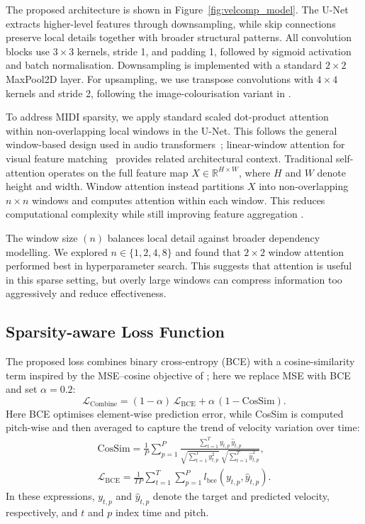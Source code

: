 The proposed architecture is shown in Figure~\ref{fig:velcomp_model}.
The U-Net extracts higher-level features through downsampling, while skip connections preserve local details together with broader structural patterns.
All convolution blocks use \(3 \times 3\) kernels, stride 1, and padding 1, followed by sigmoid activation and batch normalisation.
Downsampling is implemented with a standard \(2 \times 2\) MaxPool2D layer.
For upsampling, we use transpose convolutions with \(4 \times 4\) kernels and stride 2, following the image-colourisation variant in \cite{wang2022cunet}.

To address MIDI sparsity, we apply standard scaled dot-product attention~\cite{vas2017attn} within non-overlapping local windows in the U-Net. This follows the general window-based design used in audio transformers~\cite{chen2022hts}; linear-window attention for visual feature matching~\cite{shen2023linear} provides related architectural context.
Traditional self-attention \cite{vas2017attn} operates on the full feature map \(X \in \mathbb{R}^{H \times W}\), where \(H\) and \(W\) denote height and width.
Window attention instead partitions \(X\) into non-overlapping \(n \times n\) windows and computes attention within each window.
This reduces computational complexity while still improving feature aggregation \cite{chen2022hts}.

The window size \((n)\) balances local detail against broader dependency modelling.
We explored \(n \in \{1, 2, 4, 8\}\) and found that \(2 \times 2\) window attention performed best in hyperparameter search.
This suggests that attention is useful in this sparse setting, but overly large windows can compress information too aggressively and reduce effectiveness.

\subsection{Sparsity-aware Loss Function}
\label{sec:velcomp:loss}

The proposed loss combines binary cross-entropy (BCE) with a cosine-similarity term inspired by the MSE--cosine objective of \cite{kim2023piano}; here we replace MSE with BCE and set \(\alpha=0.2\):
\begin{equation}
\mathcal{L}_{\mathrm{Combine}} = (1-\alpha)\,\mathcal{L}_{\mathrm{BCE}} + \alpha\,\left(1-\mathrm{CosSim}\right).
\label{eq:velcomp_loss_combine}
\end{equation}
Here BCE optimises element-wise prediction error, while CosSim is computed pitch-wise and then averaged to capture the trend of velocity variation over time:
\begin{gather}
\mathrm{CosSim} = \frac{1}{P}\sum_{p=1}^{P}
\frac{\sum_{t=1}^{T} y_{t,p}\,\hat{y}_{t,p}}
{\sqrt{\sum_{t=1}^{T} y_{t,p}^{2}}\;\sqrt{\sum_{t=1}^{T} \hat{y}_{t,p}^{2}}},
\label{eq:velcomp_cossim}\\
\mathcal{L}_{\mathrm{BCE}} = \frac{1}{TP}\sum_{t=1}^{T}\sum_{p=1}^{P}
l_{\mathrm{bce}}\!\left(y_{t,p}, \hat{y}_{t,p}\right).
\label{eq:velcomp_bce}
\end{gather}
In these expressions, \(y_{t,p}\) and \(\hat{y}_{t,p}\) denote the target and predicted velocity, respectively, and \(t\) and \(p\) index time and pitch.

